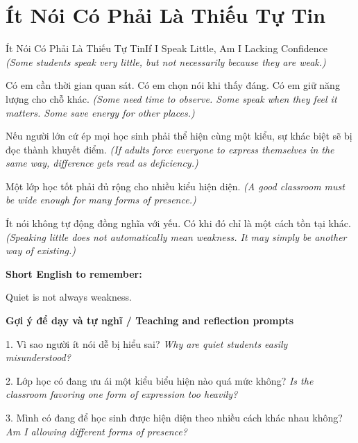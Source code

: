 \section{Ít Nói Có Phải Là Thiếu Tự Tin}
\begin{truyen}{Ít Nói Có Phải Là Thiếu Tự Tin}{If I Speak Little, Am I Lacking Confidence}
\textit{(Some students speak very little, but not necessarily because they are weak.)}

Có em cần thời gian quan sát. Có em chọn nói khi thấy đáng. Có em giữ năng lượng cho chỗ khác.
\textit{(Some need time to observe. Some speak when they feel it matters. Some save energy for other places.)}

Nếu người lớn cứ ép mọi học sinh phải thể hiện cùng một kiểu, sự khác biệt sẽ bị đọc thành khuyết điểm.
\textit{(If adults force everyone to express themselves in the same way, difference gets read as deficiency.)}

Một lớp học tốt phải đủ rộng cho nhiều kiểu hiện diện.
\textit{(A good classroom must be wide enough for many forms of presence.)}

\end{truyen}

\begin{baihoc}
Ít nói không tự động đồng nghĩa với yếu. Có khi đó chỉ là một cách tồn tại khác.
\textit{(Speaking little does not automatically mean weakness. It may simply be another way of existing.)}
\end{baihoc}

\begin{ghinhoanh}
\textbf{Short English to remember:}

Quiet is not always weakness.

\end{ghinhoanh}

\begin{tuhocnhanh}
\textbf{Gợi ý để dạy và tự nghĩ / Teaching and reflection prompts}

1. Vì sao người ít nói dễ bị hiểu sai? \textit{Why are quiet students easily misunderstood?}

2. Lớp học có đang ưu ái một kiểu biểu hiện nào quá mức không? \textit{Is the classroom favoring one form of expression too heavily?}

3. Mình có đang để học sinh được hiện diện theo nhiều cách khác nhau không? \textit{Am I allowing different forms of presence?}
\end{tuhocnhanh}
\ngancach

